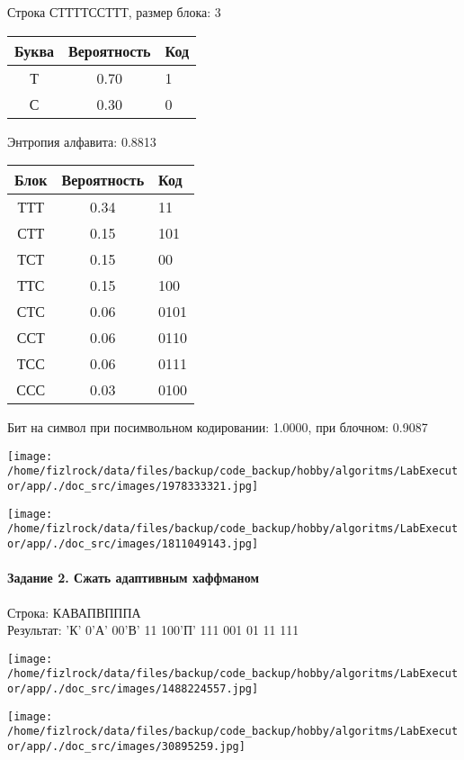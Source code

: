 \documentclass[a4paper, 12pt]{article}
\begin{document}
Строка СТТТТССТТТ, размер блока: 3
\begin{center}
 \begin{tabular}{ |c|c|l| } 
  \hline
     Буква & Вероятность & Код\\ \hline
Т & 0.70 & 1\\\hline
С & 0.30 & 0
\\ \hline \end{tabular}
\end{center}
Энтропия алфавита: 0.8813
\begin{center}
 \begin{tabular}{ |c|c|l| } 
  \hline
     Блок & Вероятность & Код\\ \hline
ТТТ & 0.34 & 11\\\hline
СТТ & 0.15 & 101\\\hline
ТСТ & 0.15 & 00\\\hline
ТТС & 0.15 & 100\\\hline
СТС & 0.06 & 0101\\\hline
ССТ & 0.06 & 0110\\\hline
ТСС & 0.06 & 0111\\\hline
ССС & 0.03 & 0100
\\ \hline \end{tabular}
\end{center}
Бит на символ при посимвольном кодировании: 1.0000, при блочном: 0.9087

\texttt{[image: /home/fizlrock/data/files/backup/code\_backup/hobby/algoritms/LabExecutor/app/./doc\_src/images/1978333321.jpg]}

\texttt{[image: /home/fizlrock/data/files/backup/code\_backup/hobby/algoritms/LabExecutor/app/./doc\_src/images/1811049143.jpg]}
\pagebreak
\paragraph{Задание 2. Сжать адаптивным хаффманом\\}

Строка: 
КАВАПВПППА\\
Результат: 'К' 0'А' 00'В' 11 100'П' 111 001 01 11 111

\texttt{[image: /home/fizlrock/data/files/backup/code\_backup/hobby/algoritms/LabExecutor/app/./doc\_src/images/1488224557.jpg]}

\texttt{[image: /home/fizlrock/data/files/backup/code\_backup/hobby/algoritms/LabExecutor/app/./doc\_src/images/30895259.jpg]}
\end{document}

